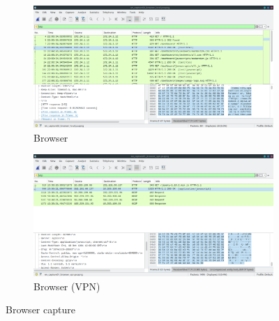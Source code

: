 \documentclass[11pt,a4paper]{report}
\begin{document}
\begin{flushleft}
\begin{flushleft}
                \begin{figure}[t]
                    \centering
                        \begin{subfigure}{0.49\linewidth} \centering
                            \includegraphics[scale=0.20]{wscapwcsocket08} %
                            \caption{Browser} \label{fig:wireshark4}
                        \end{subfigure}
                        \begin{subfigure}{0.49\linewidth} \centering
                            \includegraphics[scale=0.20]{wscapwcsocket07} %
                            \caption{Browser (VPN)} \label{fig:wireshark3}
                        \end{subfigure}
                    \caption{Browser capture} \label{fig:twobrowsers}
                    \end{figure}


\end{flushleft}
\end{flushleft}
\end{document}
